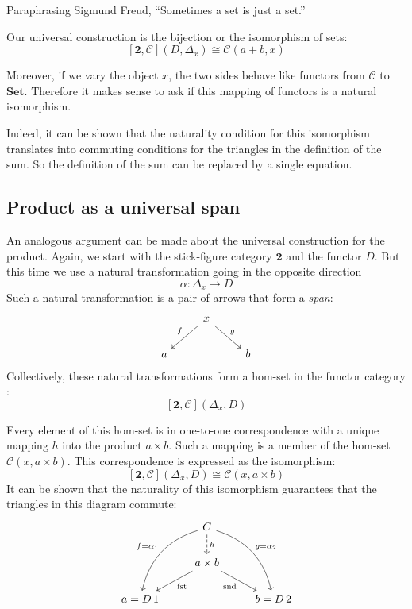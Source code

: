 \documentclass[DaoFP]{subfiles}
\begin{document}
Paraphrasing Sigmund Freud, ``Sometimes a set is just a set.''

Our universal construction is the bijection or the isomorphism of sets:
\[ [\mathbf{2}, \mathcal{C}](D, \Delta_x)  \cong \mathcal{C}(a + b, x) \]

Moreover, if we vary the object $x$, the two sides behave like functors from  $\mathcal{C}$ to $\mathbf{Set}$. Therefore it makes sense to ask if this mapping of functors is a natural isomorphism. 

Indeed, it can be shown that the naturality condition for this isomorphism translates into commuting conditions for the triangles in the definition of the sum. So the definition of the sum can be replaced by a single equation.

\subsection{Product as a universal span}

An analogous argument can be made about the universal construction for the product. Again, we start with the stick-figure category $\mathbf{2}$ and the functor $D$. But this time we use a natural transformation going in the opposite direction
\[ \alpha \colon \Delta_x \to D \]
Such a natural transformation is a pair of arrows that form a \emph{span}:
\[
 \begin{tikzcd}
 &x
 \arrow[dl, "f"']
 \arrow[dr, "g"]
 \\
 a
 && b
  \end{tikzcd}
\]
Collectively, these natural transformations form a hom-set in the functor category :
\[[\mathbf{2}, \mathcal{C}](\Delta_x, D) \]

Every element of this hom-set is in one-to-one correspondence with a unique mapping $h$ into the product $a \times b$. Such a mapping is a member of the hom-set $\mathcal{C}(x, a \times b)$. This correspondence is expressed as the isomorphism:
\[ [\mathbf{2}, \mathcal{C}](\Delta_x, D)  \cong \mathcal{C}(x, a \times b) \]
It can be shown that the naturality of this isomorphism guarantees that the triangles in this diagram commute:
\[
 \begin{tikzcd}
 & C 
\arrow[d, dashed, "h"]
 \arrow[ddl, bend right, "f = \alpha_1"']
 \arrow[ddr, bend left, "g = \alpha_2"]
\\
&a \times b
 \arrow[dl,  "\text{fst}"]
  \arrow[dr,   "\text{snd}"']
\\
a = D\, 1 && b = D \, 2
 \end{tikzcd}
\]
\end{document}
